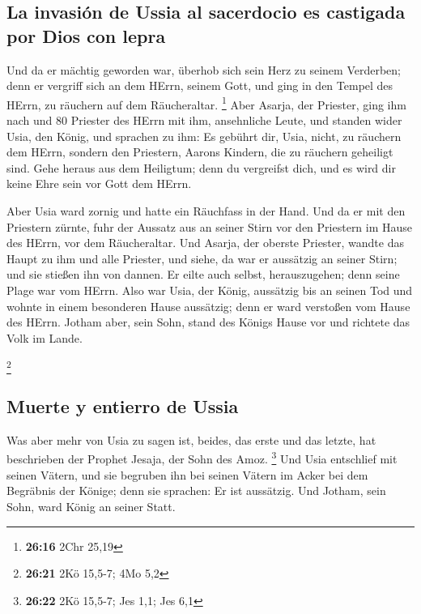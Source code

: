 \hypertarget{la-invasiuxf3n-de-ussia-al-sacerdocio-es-castigada-por-dios-con-lepra}{%
\subsection{La invasión de Ussia al sacerdocio es castigada por Dios con
lepra}\label{la-invasiuxf3n-de-ussia-al-sacerdocio-es-castigada-por-dios-con-lepra}}

 Und da er mächtig geworden war, überhob sich sein Herz
zu seinem Verderben; denn er vergriff sich an dem HErrn, seinem Gott,
und ging in den Tempel des HErrn, zu räuchern auf dem Räucheraltar.
\footnote{\textbf{26:16} 2Chr 25,19}  Aber Asarja, der
Priester, ging ihm nach und 80 Priester des HErrn mit ihm, ansehnliche
Leute,  und standen wider Usia, den König, und sprachen
zu ihm: Es gebührt dir, Usia, nicht, zu räuchern dem HErrn, sondern den
Priestern, Aarons Kindern, die zu räuchern geheiligt sind. Gehe heraus
aus dem Heiligtum; denn du vergreifst dich, und es wird dir keine Ehre
sein vor Gott dem HErrn.

 Aber Usia ward zornig und hatte ein Räuchfass in der
Hand. Und da er mit den Priestern zürnte, fuhr der Aussatz aus an seiner
Stirn vor den Priestern im Hause des HErrn, vor dem Räucheraltar.
 Und Asarja, der oberste Priester, wandte das Haupt zu
ihm und alle Priester, und siehe, da war er aussätzig an seiner Stirn;
und sie stießen ihn von dannen. Er eilte auch selbst, herauszugehen;
denn seine Plage war vom HErrn.  Also war Usia, der
König, aussätzig bis an seinen Tod und wohnte in einem besonderen Hause
aussätzig; denn er ward verstoßen vom Hause des HErrn. Jotham aber, sein
Sohn, stand des Königs Hause vor und richtete das Volk im Lande.

\footnote{\textbf{26:21} 2Kö 15,5-7; 4Mo 5,2}

\hypertarget{muerte-y-entierro-de-ussia}{%
\subsection{Muerte y entierro de
Ussia}\label{muerte-y-entierro-de-ussia}}

 Was aber mehr von Usia zu sagen ist, beides, das erste
und das letzte, hat beschrieben der Prophet Jesaja, der Sohn des Amoz.
\footnote{\textbf{26:22} 2Kö 15,5-7; Jes 1,1; Jes 6,1} 
Und Usia entschlief mit seinen Vätern, und sie begruben ihn bei seinen
Vätern im Acker bei dem Begräbnis der Könige; denn sie sprachen: Er ist
aussätzig. Und Jotham, sein Sohn, ward König an seiner Statt.

